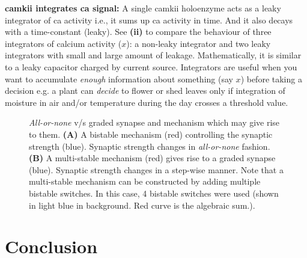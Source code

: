 \documentclass[]{resonance}
\begin{document}
{    \textbf{\gls{camkii} integrates \gls{ca} signal:} A single \gls{camkii}
    holoenzyme acts as a leaky integrator of \gls{ca} activity i.e., it sums up
    \gls{ca} activity in time. And it also decays with a time-constant (leaky).
    See \textbf{(ii)} to compare the behaviour of three integrators of calcium
    activity ($x$): a non-leaky integrator and two leaky integrators with small
    and large amount of leakage. Mathematically, it is similar to a leaky
    capacitor charged by current source. Integrators are useful when you want to
    accumulate \emph{enough} information about something (say $x$) before taking
    a decision e.g.  a plant can \emph{decide} to flower or shed leaves only if
    integration of moisture in air and/or temperature during the day crosses a
    threshold value.

} %

\begin{figure}[h!]
    \centering
    \caption{\textit{All-or-none} v/s graded synapse and mechanism which may
        give rise to them. \textbf{(A)} A bistable mechanism (red) controlling the 
        synaptic strength (blue). Synaptic strength changes in \textit{all-or-none}
        fashion. \textbf{(B)} A multi-stable mechanism (red) gives rise to a
        graded synapse (blue). Synaptic strength changes in a step-wise manner. Note that 
        a multi-stable mechanism can be constructed by adding multiple bistable
        switches. In this case, 4 bistable switches were used (shown in light
        blue in background. Red curve is the algebraic sum.).
    }
    \label{fig:fig_bistable_multistable}
    \vspace{2mm}
\end{figure}


\section{Conclusion} 
\end{document}
